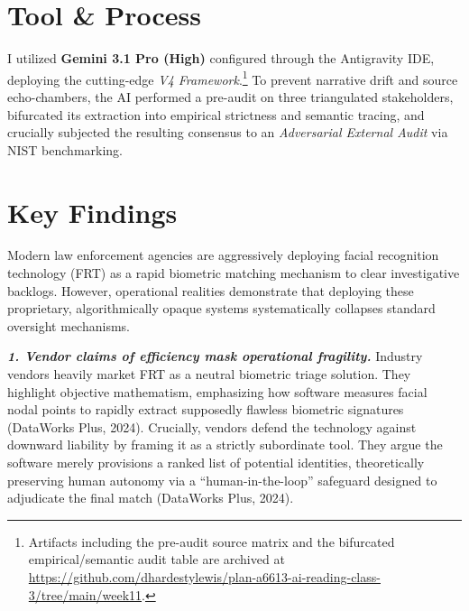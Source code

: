 \documentclass[11pt, twocolumn]{article}
\begin{document}

\section*{Tool \& Process}
I utilized \textbf{Gemini 3.1 Pro (High)} configured through the Antigravity IDE, deploying the cutting-edge \textit{V4 Framework}.\footnote{Artifacts including the pre-audit source matrix and the bifurcated empirical/semantic audit table are archived at \url{https://github.com/dhardestylewis/plan-a6613-ai-reading-class-3/tree/main/week11}.} To prevent narrative drift and source echo-chambers, the AI performed a pre-audit on three triangulated stakeholders, bifurcated its extraction into empirical strictness and semantic tracing, and crucially subjected the resulting consensus to an \textit{Adversarial External Audit} via NIST benchmarking.

\section*{Key Findings}
\noindent Modern law enforcement agencies are aggressively deploying facial recognition technology (FRT) as a rapid biometric matching mechanism to clear investigative backlogs. However, operational realities demonstrate that deploying these proprietary, algorithmically opaque systems systematically collapses standard oversight mechanisms.

\textbf{\textit{1. Vendor claims of efficiency mask operational fragility.}}
Industry vendors heavily market FRT as a neutral biometric triage solution. They highlight objective mathematism, emphasizing how software measures facial nodal points to rapidly extract supposedly flawless biometric signatures (DataWorks Plus, 2024). Crucially, vendors defend the technology against downward liability by framing it as a strictly subordinate tool. They argue the software merely provisions a ranked list of potential identities, theoretically preserving human autonomy via a ``human-in-the-loop'' safeguard designed to adjudicate the final match (DataWorks Plus, 2024).
\end{document}
